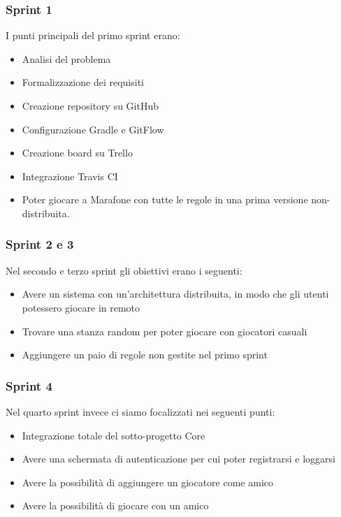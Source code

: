 \subsubsection{Sprint 1}
I punti principali del primo sprint erano:
 \begin {itemize}
  \item Analisi del problema
  \item Formalizzazione dei requisiti
  \item Creazione repository su GitHub
  \item Configurazione Gradle e GitFlow
  \item Creazione board su Trello
  \item Integrazione Travis CI
  \item Poter giocare a Marafone con tutte le regole in una prima versione non-distribuita.
\end {itemize}

\subsubsection{Sprint 2 e 3}
Nel secondo e terzo sprint gli obiettivi erano i seguenti:
 \begin {itemize}
  \item Avere un sistema con un'architettura distribuita, in modo che gli utenti potessero giocare in remoto
  \item Trovare una stanza random per poter giocare con giocatori casuali
  \item Aggiungere un paio di regole non gestite nel primo sprint
\end {itemize}

\subsubsection{Sprint 4}
Nel quarto sprint invece ci siamo focalizzati nei seguenti punti:
 \begin {itemize}
  \item Integrazione totale del sotto-progetto Core
  \item Avere una schermata di autenticazione per cui poter registrarsi e loggarsi
  \item Avere la possibilità di aggiungere un giocatore come amico
  \item Avere la possibilità di giocare con un amico
\end {itemize}

